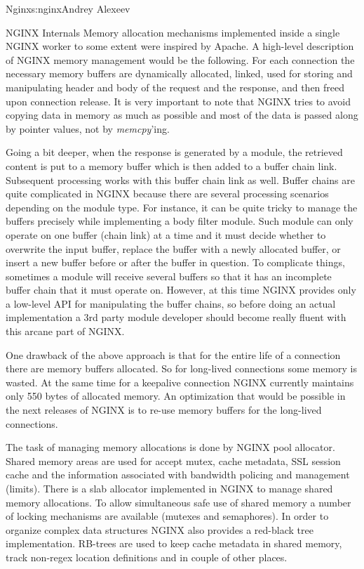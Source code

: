 \begin{aosachapter}{Nginx}{s:nginx}{Andrey Alexeev}
\begin{aosasect1}{NGINX Internals}
Memory allocation mechanisms implemented inside a single NGINX worker
to some extent were inspired by Apache. A high-level description of
NGINX memory management would be the following. For each connection
the necessary memory buffers are dynamically allocated, linked, used
for storing and manipulating header and body of the request and the
response, and then freed upon connection release. It is very important
to note that NGINX tries to avoid copying data in memory as much as
possible and most of the data is passed along by pointer values, not
by \emph{memcpy}'ing.

Going a bit deeper, when the response is generated by a module, the
retrieved content is put to a memory buffer which is then added to a
buffer chain link. Subsequent processing works with this buffer chain
link as well. Buffer chains are quite complicated in NGINX because
there are several processing scenarios depending on the module
type. For instance, it can be quite tricky to manage the buffers
precisely while implementing a body filter module. Such module can
only operate on one buffer (chain link) at a time and it must decide
whether to overwrite the input buffer, replace the buffer with a newly
allocated buffer, or insert a new buffer before or after the buffer in
question. To complicate things, sometimes a module will receive
several buffers so that it has an incomplete buffer chain that it must
operate on. However, at this time NGINX provides only a low-level API
for manipulating the buffer chains, so before doing an actual
implementation a 3rd party module developer should become really
fluent with this arcane part of NGINX.

One drawback of the above approach is that for the entire life of a
connection there are memory buffers allocated. So for long-lived
connections some memory is wasted. At the same time for a keepalive
connection NGINX currently maintains only 550 bytes of allocated
memory. An optimization that would be possible in the next releases of
NGINX is to re-use memory buffers for the long-lived connections.

The task of managing memory allocations is done by NGINX pool
allocator. Shared memory areas are used for accept mutex, cache
metadata, SSL session cache and the information associated with
bandwidth policing and management (limits). There is a slab allocator
implemented in NGINX to manage shared memory allocations. To allow
simultaneous safe use of shared memory a number of locking mechanisms
are available (mutexes and semaphores).  In order to organize complex
data structures NGINX also provides a red-black tree
implementation. RB-trees are used to keep cache metadata in shared
memory, track non-regex location definitions and in couple of other
places.


\end{aosasect1}
\end{aosachapter}
